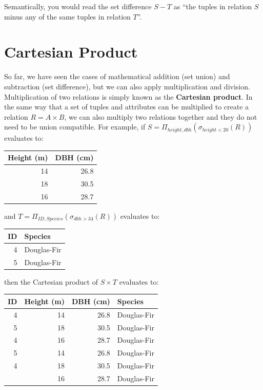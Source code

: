 \documentclass[
]{book}
\begin{document}
Semantically, you would read the set difference \(S-T\) as ``the tuples in relation \(S\) minus any of the same tuples in relation \(T\)''.

\hypertarget{cartesian-product}{%
\section{Cartesian Product}\label{cartesian-product}}

So far, we have seen the cases of mathematical addition (set union) and subtraction (set difference), but we can also apply multiplication and division. Multiplication of two relations is simply known as the \textbf{Cartesian product}. In the same way that a set of tuples and attributes can be multiplied to create a relation \(R=A×B\), we can also multiply two relations together and they do not need to be union compatible. For example, if \(S = Π_{height,dbh}(σ_{height<20}(R))\) evaluates to:

\begin{tabular}{rr}
\toprule
Height (m) & DBH (cm)\\
\midrule
14 & 26.8\\
18 & 30.5\\
16 & 28.7\\
\bottomrule
\end{tabular}

and \(T = Π_{ID,Species}(σ_{dbh>34}(R))\) evaluates to:

\begin{tabular}{rl}
\toprule
ID & Species\\
\midrule
4 & Douglas-Fir\\
5 & Douglas-Fir\\
\bottomrule
\end{tabular}

then the Cartesian product of \(S×T\) evaluates to:

\begin{tabular}{rrrl}
\toprule
ID & Height (m) & DBH (cm) & Species\\
\midrule
4 & 14 & 26.8 & Douglas-Fir\\
5 & 18 & 30.5 & Douglas-Fir\\
4 & 16 & 28.7 & Douglas-Fir\\
5 & 14 & 26.8 & Douglas-Fir\\
4 & 18 & 30.5 & Douglas-Fir\\
\addlinespace
5 & 16 & 28.7 & Douglas-Fir\\
\bottomrule
\end{tabular}
\end{document}
